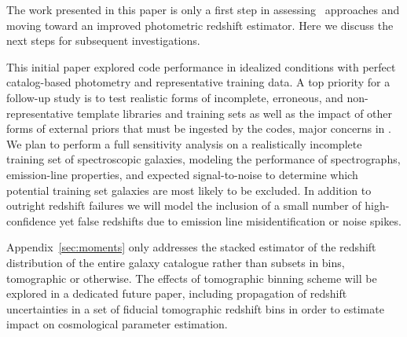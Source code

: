 
The work presented in this paper is only a first step in assessing \pzpdf\ approaches and moving toward an improved photometric redshift estimator.
Here we discuss the next steps for subsequent investigations.

This initial paper explored code performance in idealized conditions with perfect catalog-based photometry and representative training data.
A top priority for a follow-up study is to test realistic forms of incomplete, erroneous, and non-representative template libraries and training sets as well as the impact of other forms of external priors that must be ingested by the codes, major concerns in \citet{Newman:2015, Masters:2017}.
We plan to perform a full sensitivity analysis on a realistically incomplete training set of spectroscopic galaxies, modeling the performance of spectrographs, emission-line properties, and expected signal-to-noise to determine which potential training set galaxies are most likely to be excluded.
In addition to outright redshift failures we will model the inclusion of a small number of high-confidence yet false redshifts due to emission line misidentification or noise spikes.

Appendix~\ref{sec:moments} only addresses the stacked estimator of the redshift distribution of the entire galaxy catalogue rather than subsets in bins, tomographic or otherwise.
The effects of tomographic binning scheme will be explored in a dedicated future paper, including propagation of redshift uncertainties in a set of fiducial tomographic redshift bins in order to estimate impact on cosmological parameter estimation.


